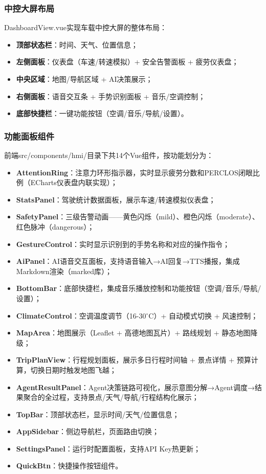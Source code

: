 \documentclass[a4paper]{article}
\begin{document}
\subsubsection{中控大屏布局}

DashboardView.vue实现车载中控大屏的整体布局：

\begin{itemize}
    \item \textbf{顶部状态栏}：时间、天气、位置信息；
    \item \textbf{左侧面板}：仪表盘（车速/转速模拟）+ 安全告警面板 + 疲劳仪表盘；
    \item \textbf{中央区域}：地图/导航区域 + AI决策展示；
    \item \textbf{右侧面板}：语音交互条 + 手势识别面板 + 音乐/空调控制；
    \item \textbf{底部快捷栏}：一键功能按钮（空调/音乐/导航/设置）。
\end{itemize}

\subsubsection{功能面板组件}

前端src/components/hmi/目录下共14个Vue组件，按功能划分为：

\begin{itemize}
    \item \textbf{AttentionRing}：注意力环形指示器，实时显示疲劳分数和PERCLOS闭眼比例（ECharts仪表盘内联实现）；
    \item \textbf{StatsPanel}：驾驶统计数据面板，展示车速/转速模拟仪表盘；
    \item \textbf{SafetyPanel}：三级告警动画——黄色闪烁（mild）、橙色闪烁（moderate）、红色脉冲（dangerous）；
    \item \textbf{GestureControl}：实时显示识别到的手势名称和对应的操作指令；
    \item \textbf{AiPanel}：AI语音交互面板，支持语音输入→AI回复→TTS播报，集成Markdown渲染（marked库）；
    \item \textbf{BottomBar}：底部快捷栏，集成音乐播放控制和功能按钮（空调/音乐/导航/设置）；
    \item \textbf{ClimateControl}：空调温度调节（16-30$^\circ$C）+ 自动模式切换 + 风速控制；
    \item \textbf{MapArea}：地图展示（Leaflet + 高德地图瓦片）+ 路线规划 + 静态地图降级；
    \item \textbf{TripPlanView}：行程规划面板，展示多日行程时间轴 + 景点详情 + 预算计算，切换日期时触发地图飞越；
    \item \textbf{AgentResultPanel}：Agent决策链路可视化，展示意图分解→Agent调度→结果聚合的全过程，支持景点/天气/导航/行程结构化展示；
    \item \textbf{TopBar}：顶部状态栏，显示时间/天气/位置信息；
    \item \textbf{AppSidebar}：侧边导航栏，页面路由切换；
    \item \textbf{SettingsPanel}：运行时配置面板，支持API Key热更新；
    \item \textbf{QuickBtn}：快捷操作按钮组件。
\end{itemize}
\end{document}
